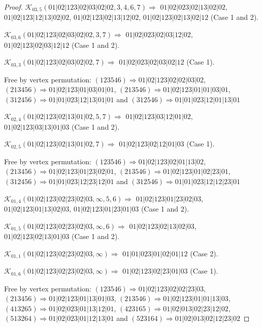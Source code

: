 \documentclass[12pt]{article}
\theoremstyle{plain}
\theoremstyle{definition}
\theoremstyle{remark}
\newcommand{\fancy}[1]{\mathcal{#1}}
\def\K{\fancy{K}}
\begin{document}
\begin{proof}
	
	
	\bigskip
	
	$\K_{03,5}(01|02|123|02|03|02|02,3, 4, 6, 7)\Rightarrow $ $01|02|023|02|13|02|02$, $01|02|123|12|13|02|02$, $01|02|123|02|13|12|02$, $01|02|123|02|13|02|12$ (Case 1 and 2).
	
	$\K_{03,6}(01|02|123|02|03|02|02,3, 7)\Rightarrow $ $01|02|023|02|03|12|02$, $01|02|123|02|03|12|12$ (Case 1 and 2).
	
	$\K_{03,3}(01|02|123|02|03|02|02,7)\Rightarrow $ $01|02|023|02|03|02|12$ (Case 1).
	
	
	
	Free by vertex permutation: $(1 2 3 5 4 6)\Rightarrow 01|02|123|02|02|03|02$, $(2 1 3 4 5 6)\Rightarrow 01|02|123|01|03|01|01$, $(2 1 3 5 4 6)\Rightarrow 01|02|123|01|01|03|01$, $(3 1 2 4 5 6)\Rightarrow 01|01|023|12|13|01|01$ and $(3 1 2 5 4 6)\Rightarrow 01|01|023|12|01|13|01$
	
	
	
	\bigskip
	
	$\K_{02,4}(01|02|123|02|13|01|02,5, 7)\Rightarrow $ $01|02|123|03|12|01|02$, $01|02|123|03|13|01|03$ (Case 1 and 2).
	
	$\K_{02,5}(01|02|123|02|13|01|02,7)\Rightarrow $ $01|02|123|02|12|01|03$ (Case 1).
	
	
	
	Free by vertex permutation: $(1 2 3 5 4 6)\Rightarrow 01|02|123|02|01|13|02$, $(2 1 3 4 5 6)\Rightarrow 01|02|123|01|23|02|01$, $(2 1 3 5 4 6)\Rightarrow 01|02|123|01|02|23|01$, $(3 1 2 4 5 6)\Rightarrow 01|01|023|12|23|12|01$ and $(3 1 2 5 4 6)\Rightarrow 01|01|023|12|12|23|01$
	
	
	
	\bigskip
	
	$\K_{01,4}(01|02|123|02|23|02|03,\infty,5, 6)\Rightarrow $ $01|02|123|01|23|02|03$, $01|02|123|01|13|02|03$, $01|02|123|01|23|01|03$ (Case 1 and 2).
	
	$\K_{01,5}(01|02|123|02|23|02|03,\infty,6)\Rightarrow $ $01|02|123|02|13|02|03$, $01|02|123|02|13|01|03$ (Case 1 and 2).
	
	$\K_{01,1}(01|02|123|02|23|02|03,\infty)\Rightarrow $ $01|01|023|01|02|01|12$ (Case 2).
	
	$\K_{01,6}(01|02|123|02|23|02|03,\infty)\Rightarrow $ $01|02|123|02|23|01|03$ (Case 1).
	
	
	
	Free by vertex permutation: $(1 2 3 5 4 6)\Rightarrow 01|02|123|02|02|23|03$, $(2 1 3 4 5 6)\Rightarrow 01|02|123|01|13|01|03$, $(2 1 3 5 4 6)\Rightarrow 01|02|123|01|01|13|03$, $(4 1 3 2 6 5)\Rightarrow 01|02|023|01|13|12|01$, $(4 2 3 1 6 5)\Rightarrow 01|02|013|02|23|12|02$, $(5 1 3 2 6 4)\Rightarrow 01|02|023|01|12|13|01$ and $(5 2 3 1 6 4)\Rightarrow 01|02|013|02|12|23|02$
	

\end{proof}
\end{document}
